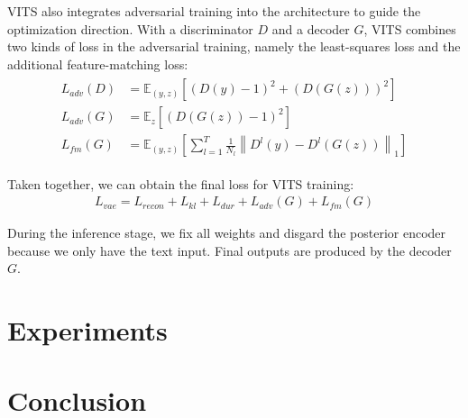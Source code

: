 \documentclass{article}
\begin{document}
VITS also integrates adversarial training into the architecture to guide the optimization direction. With a discriminator $D$ and a decoder $G$, VITS combines two kinds of loss in the adversarial training, namely the least-squares loss and the additional feature-matching loss:
\begin{align}
    \begin{split}
        L_{a d v}(D) & =\mathbb{E}_{(y, z)}\left[(D(y)-1)^{2}+(D(G(z)))^{2}\right] \\
        L_{a d v}(G) & =\mathbb{E}_{z}\left[(D(G(z))-1)^{2}\right] \\
        L_{f m}(G) & =\mathbb{E}_{(y, z)}\left[\sum_{l=1}^{T} \frac{1}{N_{l}}\left\|D^{l}(y)-D^{l}(G(z))\right\|_{1}\right]
    \end{split}
\end{align}

Taken together, we can obtain the final loss for VITS training:
\begin{align}
    L_{v a e}=L_{r e c o n}+L_{k l}+L_{d u r}+L_{a d v}(G)+L_{f m}(G)
\end{align}

During the inference stage, we fix all weights and disgard the posterior encoder because we only have the text input. Final outputs are produced by the decoder $G$.

\section{Experiments}
\label{sec:exper}

\section{Conclusion}
\label{sec:con}



  
 
\end{document}
